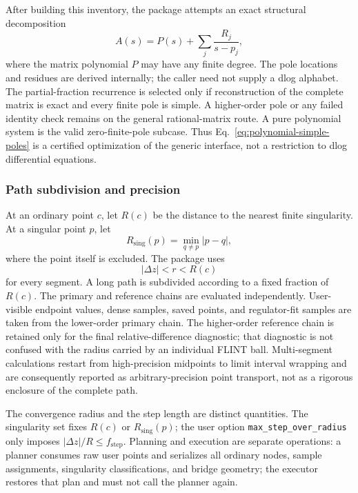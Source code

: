 \documentclass[11pt]{article}
\begin{document}
After building this inventory, the package attempts an exact structural decomposition
\begin{equation}
 A(s)=P(s)+\sum_j\frac{R_j}{s-p_j},
 \label{eq:polynomial-simple-poles}
\end{equation}
where the matrix polynomial $P$ may have any finite degree.  The pole locations and residues
are derived internally; the caller need not supply a dlog alphabet.  The partial-fraction
recurrence is selected only if reconstruction of the complete matrix is exact and every
finite pole is simple.  A higher-order pole or any failed identity check remains on the
general rational-matrix route.  A pure polynomial system is the valid zero-finite-pole
subcase.  Thus Eq.~\eqref{eq:polynomial-simple-poles} is a certified optimization of the
generic interface, not a restriction to dlog differential equations.

\subsubsection{Path subdivision and precision}
\label{subsec:path}

At an ordinary point $c$, let $R(c)$ be the distance to the nearest finite singularity.  At
a singular point $p$, let
\begin{equation}
 R_{\mathrm{sing}}(p)=\min_{q\ne p}|p-q|,
\end{equation}
where the point itself is excluded.  The package uses
\begin{equation}
  |\Delta z|<r< R(c)
\end{equation}
for every segment.  A long path is subdivided according to a fixed fraction of $R(c)$.  The
primary and reference chains are evaluated independently.  User-visible endpoint values,
dense samples, saved points, and regulator-fit samples are taken from the lower-order primary
chain.  The higher-order reference chain is retained only for the final relative-difference
diagnostic; that diagnostic is not confused with the radius carried by an individual
FLINT ball.  Multi-segment calculations restart from high-precision midpoints to limit
interval wrapping and are consequently reported as arbitrary-precision point transport,
not as a rigorous enclosure of the complete path.

The convergence radius and the step length are distinct quantities.  The singularity set
fixes $R(c)$ or $R_{\mathrm{sing}}(p)$; the user option
\texttt{max\_step\_over\_radius} only imposes
$|\Delta z|/R\leq f_{\mathrm{step}}$.  Planning and execution are separate operations:
a planner consumes raw user points and serializes all ordinary nodes, sample assignments,
singularity classifications, and bridge geometry; the executor restores that plan and must
not call the planner again.
\end{document}
